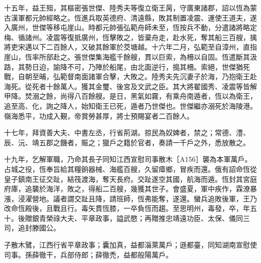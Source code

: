 \begin{pinyinscope}
 十五年，益王殂，其樞密張世傑、陸秀夫等復立衛王昺，守廣東諸郡，詔以恆為蒙古漢軍都元帥經略之。恆進兵取英德府、清遠縣，敗其制置凌震、運使王道夫，遂入廣州，世傑等移屯崖山。時都元帥張弘範舟師未至，恆按兵不動，分遣諸將略定梅、循諸州。凌震等復抵廣州，恆擊敗之，皆棄舟走，赴水死，奪其船三百艘，擒將吏宋邁以下二百餘人，又破其餘軍於茭塘越。十六年二月，弘範至自漳州，直指崖山，恆率所部赴之。張世傑集海艦千餘艘，貫以巨索，為柵以自固。恆遣斷其汲路，其勢日迫，諭降不可，乃陣於船尾，由北面逆行，搗其柵。索絕，世傑猶死戰，自朝至晡，弘範督南面諸軍合擊，大敗之。陸秀夫先沉妻子於海，乃抱衛王赴海死。從死者十餘萬人。獲其金璽、後宮及文武之臣。其大將翟國秀、凌震等皆解甲降。焚溺之餘，尚得八百餘艘。是日，黑氣如霧，有乘舟南遁者，恆以為衛王，追至高、化，詢之降人，始知衛王已死，遁者乃世傑也。世傑繼亦溺死於海陵港。嶺海悉平，功成入覲，帝賞勞甚厚，將士預賜宴者二百餘人。



 十七年，拜資善大夫、中書左丞，行省荊湖。掠民為奴婢者，禁之；常德、澧、辰、沅、靖五郡之饑者，賑之；獵戶之籍於官者，奏請一千戶之外，悉放散之。



 十九年，乞解軍職，乃命其長子同知江西宣慰司事散木［A156］襲為本軍萬戶。占城之役，恆奉旨給其糧餉器械、海艦百艘，久留瘴鄉，冒疾而還。俄有詔命恆從皇子鎮南王征交趾，結筏渡海，奪天長府。交趾遂空其國，航海而遁。恆封其宮庭府庫，追襲於海洋，敗之，得船二百艘，幾獲其世子。會盛夏，軍中疾作，霖潦暴漲，浸濯營地。議者謂交趾且降，請班師，恆弗能奪，遂還。蠻兵追敗後軍，王乃改命恆殿後，且戰且行。毒矢貫恆膝，一卒負恆而趨。至思明州，毒發，卒，年五十。後贈銀青榮祿大夫、平章政事，謚武愍；再贈推忠靖遠功臣、太保、儀同三司，追封滕國公。



 子散木鷿，江西行省平章政事；囊加真，益都淄萊萬戶；遜都臺，同知湖南宣慰使司事。孫薛徹干，兵部侍郎；薛徹禿，益都般陽萬戶。



\end{pinyinscope}